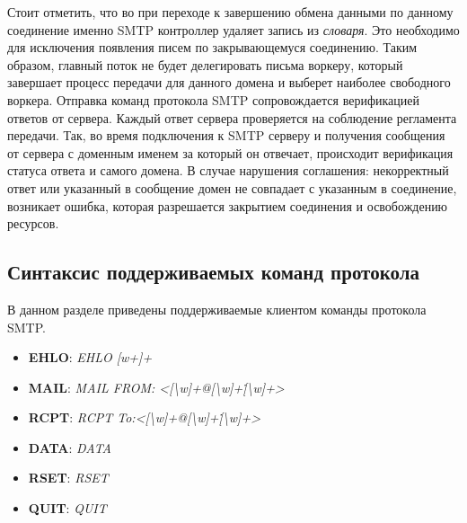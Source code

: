 \documentclass[a4paper,12pt]{report}
\begin{document}
Стоит отметить, что во при переходе к завершению обмена данными по данному соединение именно SMTP контроллер удаляет запись из \textit{словаря}. Это необходимо для исключения появления писем по закрывающемуся соединению. Таким образом, главный поток не будет делегировать письма воркеру, который завершает процесс передачи для данного домена и выберет наиболее свободного воркера.
Отправка команд протокола SMTP сопровождается верификацией ответов от сервера. Каждый ответ сервера проверяется на соблюдение регламента передачи. Так, во время подключения к SMTP серверу и получения сообщения от сервера с доменным именем за который он отвечает, происходит верификация статуса ответа и самого домена. В случае нарушения соглашения: некорректный ответ или указанный в сообщение домен не совпадает с указанным в соединение, возникает ошибка, которая разрешается закрытием соединения и освобождению ресурсов.

\subsection{Синтаксис поддерживаемых команд протокола}
В данном разделе приведены поддерживаемые клиентом команды протокола SMTP.

\begin{itemize}
    \item \textbf{EHLO}: {\it EHLO [w+]+\/}
    \item \textbf{MAIL}: {\it MAIL FROM: <[\textbackslash w]+@[\textbackslash w]+\.[\textbackslash w]+>\/}
    \item \textbf{RCPT}: {\it RCPT To:<[\textbackslash w]+@[\textbackslash w]+\.[\textbackslash w]+>\/}
    \item \textbf{DATA}: {\it DATA\/}
    \item \textbf{RSET}: {\it RSET\/}
    \item \textbf{QUIT}: {\it QUIT\/}
\end{itemize}

\end{document}
